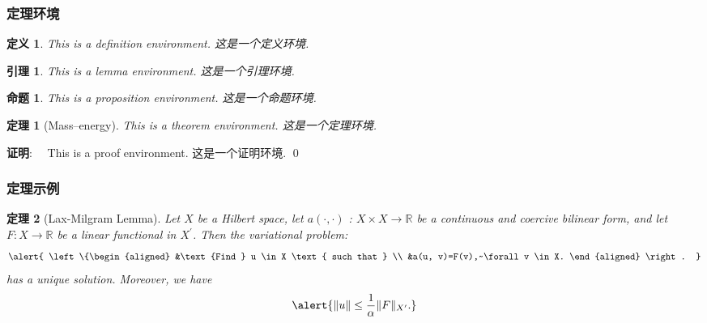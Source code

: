 \documentclass[notheorems,11pt,compress]{beamer}
\numberwithin{figure}{section}
\numberwithin{table}{section}
\numberwithin{equation}{section}
\newtheorem{theorem}{定理}
\numberwithin{theorem}{section}
\newtheorem{definition}{定义}
\numberwithin{definition}{section}
\newtheorem{lemma}{引理}
\numberwithin{lemma}{section}
\newtheorem{proposition}{命题}
\numberwithin{proposition}{section}
\numberwithin{corollary}{section}
\theoremstyle{example}
\renewenvironment{proof}[1][证明]{\textbf{#1}:~~}{\qed\par}
\begin{document}
\begin{frame}
\frametitle{定理环境}
\begin{definition} \upshape
This is a definition environment. 这是一个定义环境.
\end{definition}


\begin{lemma} \upshape
This is a lemma environment. 这是一个引理环境.
\end{lemma}

\begin{proposition} \upshape
This is a proposition environment. 这是一个命题环境.
\end{proposition}

\begin{theorem}[Mass--energy] \upshape
This is a theorem environment. 这是一个定理环境.
\end{theorem}

\begin{proof}
  This is a proof environment. 这是一个证明环境.
\end{proof}

\end{frame}


\begin{frame}
\frametitle{定理示例}

\begin{theorem}[Lax-Milgram Lemma] \upshape
Let $X$ be a Hilbert space, let $a(\cdot, \cdot)$ : $X \times X \rightarrow \mathbb{R}$ be a continuous and coercive bilinear form, and let $F : X \rightarrow \mathbb{R}$ be a linear functional in $X^{\prime}$. Then the variational problem:
\begin{equation}
  \alert{
  \left\{\begin{aligned}
  &\text {Find } u \in X \text { such that } \\
  &a(u, v)=F(v),~\forall v \in X.
  \end{aligned} \right. }
\end{equation}
has a unique solution. Moreover, we have
\begin{equation}
  \alert{ \|u\| \leq \frac{1}{\alpha}\|F\|_{X^{\prime}}.}
\end{equation}
\end{theorem}

\end{frame}

\end{document}

